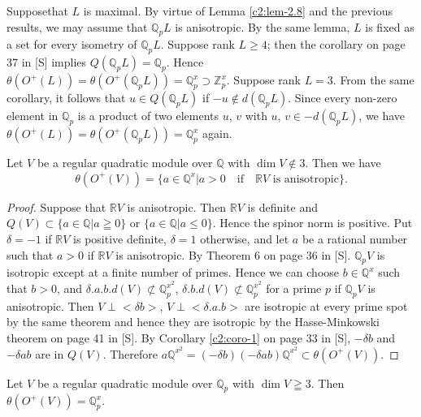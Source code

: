 Suppose\pageoriginale that $L$ is maximal. By virtue of Lemma
\ref{c2:lem-2.8} and the previous results, we may assume that
$\mathbb{Q}_{p}L$ is anisotropic. By the same lemma, $L$ is fixed as a
set for every isometry of $\mathbb{Q}_{p}L$. Suppose rank $L\geq 4$;
then the corollary on page 37 in [S] implies
$Q(\mathbb{Q}_{p}L)=\mathbb{Q}_{p}$. Hence
$\theta(O^{+}(L))=\theta(O^{+}(\mathbb{Q}_{p}L))=\mathbb{Q}^{x}_{p}\supset
\mathbb{Z}^{x}_{p}$. Suppose rank $L=3$. From the same corollary, it
follows that $u\in Q(\mathbb{Q}_{p}L)$ if $-u\not\in
d(\mathbb{Q}_{p}L)$. Since every non-zero element in $\mathbb{Q}_{p}$
is a product of two elements $u$, $v$ with $u$, $v\in
-d(\mathbb{Q}_{p}L)$, we have
$\theta(O^{+}(L))=\theta(O^{+}(\mathbb{Q}_{p}L))=\mathbb{Q}^{x}_{p}$
again. 

\begin{prop}\label{c2:prop-2.19}
Let $V$ be a regular quadratic module over $\mathbb{Q}$ with $\dim
V\not\in 3$. Then we have
$$
\theta(O^{+}(V))=\{a\in\mathbb{Q}^{x}|a>0\quad\text{if}\quad
\mathbb{R}V\text{ \ is anisotropic}\}.
$$
\end{prop}

\begin{proof}
Suppose that $\mathbb{R}V$ is anisotropic. Then $\mathbb{R}V$ is
definite and $Q(V)\subset \{a\in \mathbb{Q}|a\geqq 0\}$ or
$\{a\in\mathbb{Q}|a\leq 0\}$. Hence the spinor norm is positive. Put
$\delta=-1$ if $\mathbb{R}V$ is positive definite, $\delta=1$
otherwise, and let $a$ be a rational number such that $a>0$ if
$\mathbb{R}V$ is anisotropic. By Theorem 6 on page
36 in [S]. $\mathbb{Q}_{p}V$ is isotropic except at a finite
number of primes. Hence we can choose $b\in\mathbb{Q}^{x}$ such that
$b>0$, and $\delta.a.b.d(V)\not\subset \mathbb{Q}^{x^{2}}_{p}$,
$\delta.b.d(V)\not\subset \mathbb{Q}^{x^{2}}_{p}$ for a prime $p$ if
$\mathbb{Q}_{p}V$ is anisotropic. Then $V\perp <\delta b>$, $V\perp
<\delta.a.b>$ are isotropic at every prime spot by the same theorem
and hence they are isotropic by the Hasse-Minkowski theorem on page
41 in [S]. By Corollary \ref{c2:coro-1} on page 33 in
        [S], $-\delta b$ and $-\delta ab$ are in $Q(V)$. Therefore
        $a\mathbb{Q}^{x^{2}}=(-\delta b)(-\delta
        ab)\mathbb{Q}^{x^{2}}\subset\theta(O^{+}(V))$. 
\end{proof}

\begin{prop}\label{c2:prop-2.20}
Let $V$ be a regular quadratic module over $\mathbb{Q}_{p}$ with $\dim
V\geqq 3$. Then $\theta(O^{+}(V))=\mathbb{Q}^{x}_{p}$.
\end{prop}

